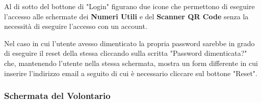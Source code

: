 \documentclass[12pt,a4paper,twoside,openright,titlepage]{book}
\begin{document}
Al di sotto del bottone di "Login" figurano due icone che permettono di eseguire l'accesso alle schermate dei \textbf{Numeri Utili} e del \textbf{Scanner QR Code} senza la necessità di eseguire l'accesso con un account.\newline

Nel caso in cui l'utente avesso dimenticato la propria password sarebbe in grado di eseguire il reset della stessa cliccando sulla scritta "Password dimenticata?" che, mantenendo l'utente nella stessa schermata, mostra un form differente in cui inserire l'indirizzo email a seguito di cui è necessario cliccare sul bottone "Reset".

\subsubsection{Schermata del Volontario}
\end{document}
